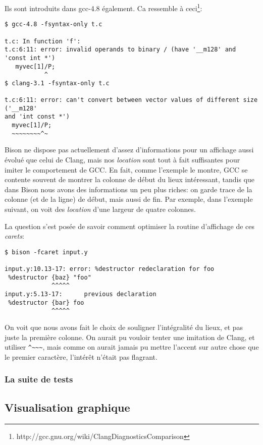 \documentclass[a4paper,11pt,twoside,final]{article}
\begin{document}
  Ils sont introduits dans gcc-4.8 également. Ca ressemble à ceci\footnote{%
  http://gcc.gnu.org/wiki/ClangDiagnosticsComparison}:

  \begin{verbatim}
$ gcc-4.8 -fsyntax-only t.c

t.c: In function 'f':
t.c:6:11: error: invalid operands to binary / (have '__m128' and 'const int *')
   myvec[1]/P;
           ^
$ clang-3.1 -fsyntax-only t.c

t.c:6:11: error: can't convert between vector values of different size ('__m128'
and 'int const *')
  myvec[1]/P;
  ~~~~~~~~^~
  \end{verbatim}

  Bison ne dispose pas actuellement d'assez d'informations pour un affichage
  aussi évolué que celui de Clang, mais nos \textit{location} sont tout à fait
  suffisantes pour imiter le comportement de GCC\@. En fait, comme l'exemple le
  montre, GCC se contente souvent de montrer la colonne de début du lieux
  intéressant, tandis que dans Bison nous avons des informations un peu plus
  riches: on garde trace de la colonne (et de la ligne) de début, mais aussi de
  fin. Par exemple, dans l'exemple suivant, on voit des \textit{location} d'une
  largeur de quatre colonnes.

  La question s'est posée de savoir comment optimiser la routine d'affichage de
  ces \textit{carets}:
  \begin{verbatim}
$ bison -fcaret input.y

input.y:10.13-17: error: %destructor redeclaration for foo
 %destructor {baz} "foo"
             ^^^^^
input.y:5.13-17:      previous declaration
 %destructor {bar} foo
             ^^^^^
\end{verbatim}

  On voit que nous avons fait le choix de souligner l'intégralité du lieux, et
  pas juste la première colonne. On aurait pu vouloir tenter une imitation de
  Clang, et utiliser \verb|^~~~|, mais comme on aurait jamais pu
  mettre l'accent sur autre chose que le premier caractère, l'intérêt n'était
  pas flagrant.


  \subsubsection{La suite de tests}

  \subsection{Visualisation graphique}
\end{document}
